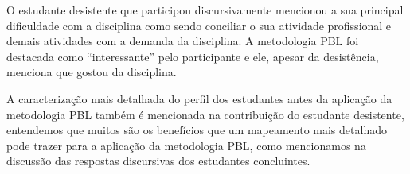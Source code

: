 O estudante desistente que participou discursivamente mencionou a sua
principal dificuldade com a disciplina como sendo conciliar o
sua atividade profissional e demais atividades com
a demanda da disciplina.
A metodologia \ac{PBL} foi destacada como ``interessante''
pelo participante e ele, apesar da desistência,
menciona que gostou da disciplina.

A caracterização mais detalhada do perfil dos estudantes
antes da aplicação da metodologia \ac{PBL} também é mencionada
na contribuição do estudante desistente, entendemos
que muitos são os benefícios que um mapeamento mais detalhado
pode trazer para a aplicação da metodologia \ac{PBL}, como
mencionamos na discussão das respostas discursivas dos estudantes
concluintes.
